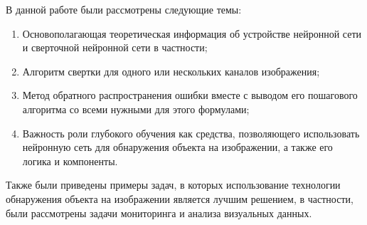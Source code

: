 \documentclass[bachelor, och, coursework]{SCWorks}
\begin{document}
\conclusion

    В данной работе были рассмотрены следующие темы:
    \begin{enumerate}
        \item Основополагающая теоретическая информация об устройстве нейронной сети и сверточной нейронной сети в частности;
        \item Алгоритм свертки для одного или нескольких каналов изображения;
        \item Метод обратного распространения ошибки вместе с выводом его пошагового алгоритма со всеми нужными для этого формулами;
        \item Важность роли глубокого обучения как средства, позволяющего использовать нейронную сеть для обнаружения объекта на изображении, а также его логика и компоненты.
    \end{enumerate}
    
    Также были приведены примеры задач, в которых использование технологии обнаружения объекта на изображении является лучшим решением, в частности, были рассмотрены задачи мониторинга и анализа визуальных данных.
\end{document}
